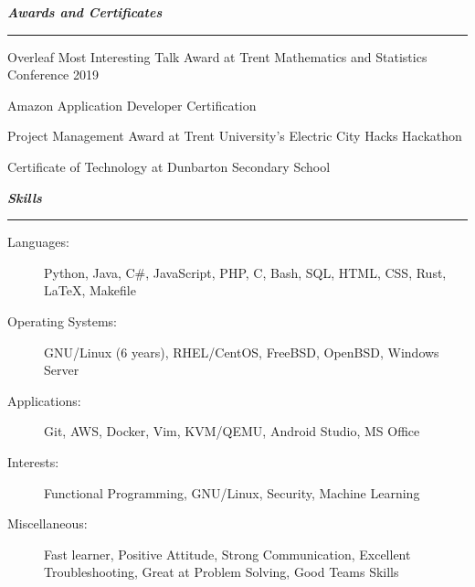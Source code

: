 \documentclass[letterpaper,11pt]{article}
\newcommand{\mysection}[1]{\vspace{5pt} {\bfseries \textsl{#1}} \\ {\color{gray} \rule[5pt]{\textwidth}{1pt}}}
\begin{document}
\mysection{Awards and Certificates}
\begin{description}
    \item Overleaf Most Interesting Talk Award at Trent Mathematics and Statistics Conference 2019
    \item Amazon Application Developer Certification
    \item Project Management Award at Trent University's Electric City Hacks Hackathon
    \item Certificate of Technology at Dunbarton Secondary School
\end{description}

\mysection{Skills}
\begin{description}
    \item[Languages:]
        Python, Java, C\#, JavaScript, PHP, C, Bash, SQL, HTML, CSS, Rust, \LaTeX{}, Makefile
    \item[Operating Systems:]
        GNU/Linux (6 years), RHEL/CentOS, FreeBSD, OpenBSD, Windows Server
    \item[Applications:]
        Git, AWS, Docker, Vim, KVM/QEMU, Android Studio, MS Office
    \item[Interests:]
        Functional Programming, GNU/Linux, Security, Machine Learning
    \item[Miscellaneous:]
        Fast learner, Positive Attitude, Strong Communication, Excellent Troubleshooting, Great at Problem Solving, Good Teams Skills
\end{description}
\end{document}
